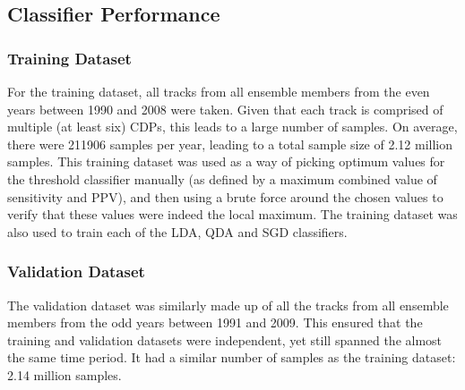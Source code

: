 \documentclass[pdftex,12pt,a4paper]{report}
\begin{document}

\subsection{Classifier Performance}


\subsubsection{Training Dataset}
\label{sec:training_dataset}
For the training dataset, all tracks from all ensemble members from the even years between 1990 and
2008 were taken. Given that each track is comprised of multiple (at least six) CDPs, this leads to a
large number of samples. On average, there were \SI{211906}{} samples per year, leading to a total
sample size of 2.12 million samples. This training dataset was used as a way of picking optimum
values for the threshold classifier manually (as defined by a maximum combined value of sensitivity
and PPV), and then using a brute force around the chosen values to verify that these values were
indeed the local maximum. The training dataset was also used to train each of the LDA, QDA and SGD
classifiers.

\subsubsection{Validation Dataset} 
The validation dataset was similarly made up of all the tracks from all ensemble members from the
odd years between 1991 and 2009. This ensured that the training and validation datasets were
independent, yet still spanned the almost the same time period. It had a similar number of samples
as the training dataset: 2.14 million samples.
\end{document}

